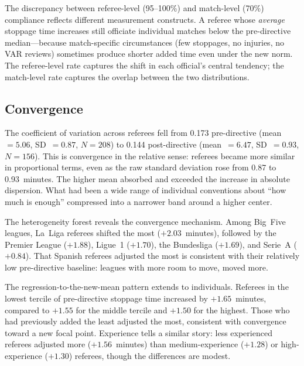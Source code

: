 The discrepancy between referee-level (95--100\%) and match-level
(70\%) compliance reflects different measurement constructs. A referee
whose \textit{average} stoppage time increases still officiate
individual matches below the pre-directive median---because
match-specific circumstances (few stoppages, no injuries, no VAR
reviews) sometimes produce shorter added time even under the new norm.
The referee-level rate captures the shift in each official's central
tendency; the match-level rate captures the overlap between the two
distributions.


\subsection{Convergence}
\label{subsec:convergence}

The coefficient of variation across referees fell from 0.173 pre-directive
(mean~$= 5.06$, SD~$= 0.87$, $N = 208$) to 0.144 post-directive
(mean~$= 6.47$, SD~$= 0.93$, $N = 156$). This is convergence in the
relative sense: referees became more similar in proportional terms, even
as the raw standard deviation rose from 0.87 to 0.93~minutes. The
higher mean absorbed and exceeded the increase in absolute dispersion.
What had been a wide range of individual conventions about ``how much
is enough'' compressed into a narrower band around a higher center.

The heterogeneity forest reveals the convergence mechanism. Among
Big~Five leagues, La~Liga referees shifted the most ($+2.03$~minutes),
followed by the Premier League ($+1.88$), Ligue~1 ($+1.70$), the
Bundesliga ($+1.69$), and Serie~A ($+0.84$). That Spanish referees
adjusted the most is consistent with their relatively low pre-directive
baseline: leagues with more room to move, moved more.

The regression-to-the-new-mean pattern extends to individuals. Referees
in the lowest tercile of pre-directive stoppage time increased by
$+1.65$~minutes, compared to $+1.55$ for the middle tercile and
$+1.50$ for the highest. Those who had previously added the least
adjusted the most, consistent with convergence toward a new focal point.
Experience tells a similar story: less experienced referees adjusted
more ($+1.56$~minutes) than medium-experience ($+1.28$) or
high-experience ($+1.30$) referees, though the differences are modest.


